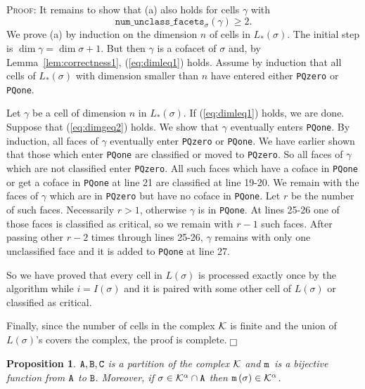 \documentclass[12pt]{article}
\newtheorem{prop}[thm]{Proposition}
\newenvironment{proof}{\noindent\textsc{Proof: }}{\hfill$\fbox{}$\par\medskip\par}
\newcommand{\cK}{{\cal K}}
\newcommand{\ma}{\texttt{m}\,} \newcommand{\re}{\texttt{r}\,}
\newcommand{\sB}{\texttt{B}}
\newcommand{\sC}{\texttt{C}} \newcommand{\sD}{\texttt{D}} \newcommand{\sM}{\texttt{M}} \newcommand{\sL}{\texttt{L}}
\begin{document}
\begin{proof}
It remains to show that (a) also holds for cells $\gamma$ with
\begin{equation}\label{eq:dimgeq2}
\texttt{{num}\_{unclass}\_{facets}}_{\sigma}(\gamma)\geq 2.
\end{equation}
We prove (a) by induction on the dimension $n$ of cells in $L_*(\sigma)$. The initial step is $\dim\gamma=\dim\sigma+1$. But then $\gamma$ is a cofacet of $\sigma$ and, by Lemma~\ref{lem:correctness1}, (\ref{eq:dimleq1}) holds. Assume by induction that all cells of $L_*(\sigma)$ with dimension smaller than $n$ have entered either \texttt{PQzero} or \texttt{PQone}.

Let $\gamma$ be a cell of dimension $n$ in $L_* (\sigma)$. If (\ref{eq:dimleq1}) holds, we are done. Suppose that (\ref{eq:dimgeq2}) holds. We show that $\gamma$ eventually enters \texttt{PQone}. By induction, all faces of $\gamma$ eventually enter \texttt{PQzero} or \texttt{PQone}. We have earlier shown that those which enter \texttt{PQone} are classified or moved to \texttt{PQzero}. So all faces of $\gamma$ which are not classified enter \texttt{PQzero}. All such faces which have a coface in \texttt{PQone} or get a coface in \texttt{PQone} at line 21 are classified at line 19-20. We remain with the faces of $\gamma$ which are in \texttt{PQzero} but have no coface in \texttt{PQone}. Let $r$ be the number of such faces. Necessarily $r>1$, otherwise $\gamma$ is in \texttt{PQone}. At lines 25-26 one of those faces is classified as critical, so we remain with $r-1$ such faces.  After passing other $r-2$ times through lines 25-26, $\gamma$ remains with only one unclassified face and it is added to \texttt{PQone} at line 27.

So we have proved that every cell in $L(\sigma)$ is processed exactly once by the algorithm while $i=I(\sigma)$ and it is paired with some other cell of $L(\sigma)$ or classified as critical.

Finally, since the number of cells in the complex $\cK$ is finite and the union of $L (\sigma)$'s covers the complex, the proof is complete.
\end{proof}

\begin{prop}\label{lem:partition}
 $\sA, \sB, \sC$ is a partition of the complex ${\cK}$ and $\ma$ is a bijective function from $\texttt{A}$ to $\sB$.
Moreover, if $\sigma\in \cK^\alpha \cap \sA$ then $\ma(\sigma)\in \cK^\alpha$.
\end{prop}
\end{document}
